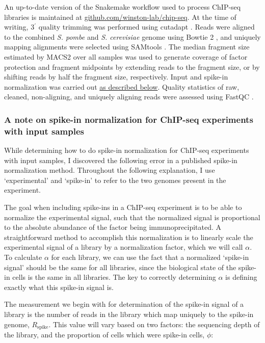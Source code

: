 An up-to-date version of the Snakemake \citep{koster2012} workflow used to process ChIP-seq libraries is maintained at \href{https://github.com/winston-lab/chip-seq}{github.com/winston-lab/chip-seq}.
At the time of writing, 3$^\prime$ quality trimming was performed using cutadapt \citep{martin2011}.
Reads were aligned to the combined \textit{S. pombe} and \textit{S. cerevisiae} genome using Bowtie 2 \citep{langmead2012}, and uniquely mapping alignments were selected using SAMtools \citep{li2009}.
The median fragment size estimated by MACS2 \citep{zhang2008} over all samples was used to generate coverage of factor protection and fragment midpoints by extending reads to the fragment size, or by shifting reads by half the fragment size, respectively.
Input and spike-in normalization was carried out \hyperref[subsubsec:chip_spikein]{as described below}.
Quality statistics of raw, cleaned, non-aligning, and uniquely aligning reads were assessed using FastQC \citep{andrews2010}.

\subsubsection[A note on spike-in normalization for ChIP-seq\\ experiments with input samples]{A note on spike-in normalization for ChIP-seq experiments with input samples}
\label{subsubsec:chip_spikein}

While determining how to do spike-in normalization for ChIP-seq experiments with input samples, I discovered the following error in a published spike-in normalization method.
Throughout the following explanation, I use `experimental' and `spike-in' to refer to the two genomes present in the experiment.

The goal when including spike-ins in a ChIP-seq experiment is to be able to normalize the experimental signal, such that the normalized signal is proportional to the absolute abundance of the factor being immunoprecipitated.
A straightforward method to accomplish this normalization is to linearly scale the experimental signal of a library by a normalization factor, which we will call $\alpha$.
To calculate $\alpha$ for each library, we can use the fact that a normalized `spike-in signal' should be the same for all libraries, since the biological state of the spike-in cells is the same in all libraries.
The key to correctly determining $\alpha$ is defining exactly what this spike-in signal is.

The measurement we begin with for determination of the spike-in signal of a library is the number of reads in the library which map uniquely to the spike-in genome, $R_{\text{spike}}$.
This value will vary based on two factors: the sequencing depth of the library, and the proportion of cells which were spike-in cells, $\phi$:


